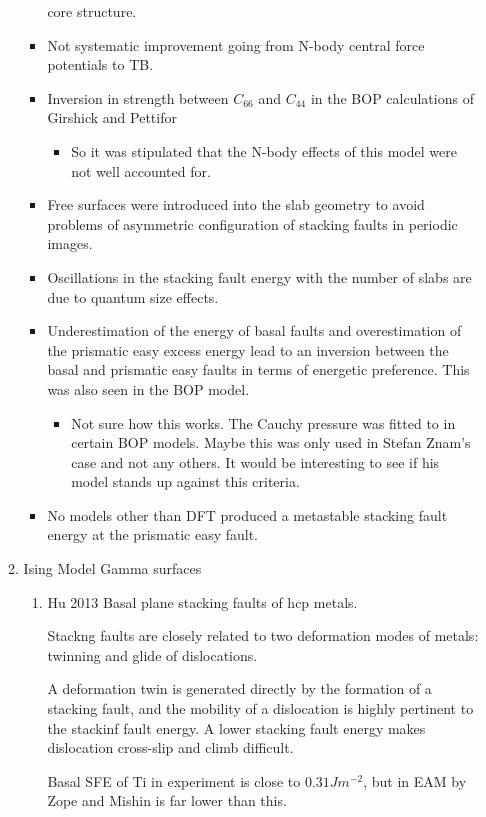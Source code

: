\documentclass[11pt]{article}
\begin{document}
\begin{enumerate}
\begin{enumerate}
\begin{itemize}
core structure.
\item Not systematic improvement going from N-body central force potentials
to TB.
\item Inversion in strength between \(C_{66}\) and \(C_{44}\) in the BOP
calculations of Girshick and Pettifor
\begin{itemize}
\item So it was stipulated that the N-body effects of this model were not
well accounted for.
\end{itemize}
\item Free surfaces were introduced into the slab geometry to avoid problems
of asymmetric configuration of stacking faults in periodic images.
\item Oscillations in the stacking fault energy with the number of slabs are
due to quantum size effects.
\item Underestimation of the energy of basal faults and overestimation of the
prismatic easy excess energy lead to an inversion between the basal and
prismatic easy faults in terms of energetic preference. This was also
seen in the BOP model.  
\begin{itemize}
\item Not sure how this works. The Cauchy pressure was fitted to in certain
BOP models. Maybe this was only used in Stefan Znam's case and not
any others. It would be interesting to see if his model stands up
against this criteria.
\end{itemize}
\item No models other than DFT produced a metastable stacking fault energy at
the prismatic easy fault.
\end{itemize}
\item Ising Model Gamma surfaces
\label{sec:orge86e17b}
\begin{enumerate}
\item Hu 2013 Basal plane stacking faults of hcp metals.
\label{sec:org1098ff4}
\cite{Hu2013}

Stackng faults are closely related to two deformation modes of metals: twinning
and glide of dislocations. 

A deformation twin is generated directly by the formation of a stacking fault,
and the mobility of a dislocation is highly pertinent to the stackinf fault
energy. 
A lower stacking fault energy makes dislocation cross-slip and climb
difficult. 

Basal SFE of Ti in experiment is close to \(0.31 Jm^{-2}\), but in EAM by Zope
and Mishin \cite{Zope2003} is far lower than this. 


\end{enumerate}
\end{enumerate}
\end{enumerate}
\end{document}
